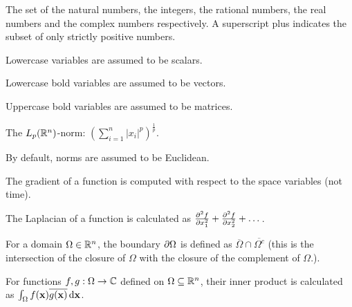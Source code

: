 \begin{description}[leftmargin=4cm, labelsep=0cm, style=multiline, itemsep=2mm, topsep=6mm]
    \item [$\begin{array}{@{}l} \NN, \ZZ, \QQ, \RR, \CC\\\NN^+, \QQ^+, \RR^+\end{array}$] The set of the natural numbers, the integers, the rational numbers, the real numbers and the complex numbers respectively. A superscript plus indicates the subset of only strictly positive numbers.
    \item [$\begin{array}{@{}l} a, b, c, \dots \\ \alpha, \beta, \gamma, \dots \end{array}$] Lowercase variables are assumed to be scalars.
    \item [$\vb{u}, \vb{v}, \dots$] Lowercase bold variables are assumed to be vectors.
    \item [$\vb{B}, \vb{M}, \vb{\Lambda}, \dots$] Uppercase bold variables are assumed to be matrices.
    \item [$\displaystyle\|\vb{x}\|_p $] The $L_p(\mathbb{R}^n)$-norm: $\left(\sum_{i=1}^{n} \left|x_i\right|^p\right)^\frac{1}{p}$.
    \item [$\displaystyle\|\vb{x}\| = \|\vb{x}\|_2$] By default, norms are assumed to be Euclidean.
    \item [$\nabla f = \left(\frac{\partial f}{\partial x_1}, \frac{\partial f}{\partial x_2}, \dots\right)^\transposesign$] The gradient of a function is computed with respect to the space variables (not time).
    \item [$\Delta f = \nabla^2 f = \nabla \cdot \nabla f$] The Laplacian of a function is calculated as ${\pdv[2]{f}{x_1}} + {\pdv[2]{f}{x_2}} + \dots$.
    \item [$\dOmega$] For a domain $\Omega \in \mathbb{R}^n$, the boundary $\dOmega$ is defined as $\overline{\Omega} \cap \overline{\Omega^c}$ (this is the intersection of the closure of $\Omega$ with the closure of the complement of $\Omega$.).
    \item [$\displaystyle\bra{f\,}\ket{\,g}$] For functions $f, g : \Omega \to \mathbb{C}$ defined on $\Omega \subseteq \mathbb{R}^n$, their inner product is calculated as $\int_\Omega f(\vb{x}) \overline{g(\vb{x})} \,\dd \vb{x}$.
\end{description}


\stopchapter
